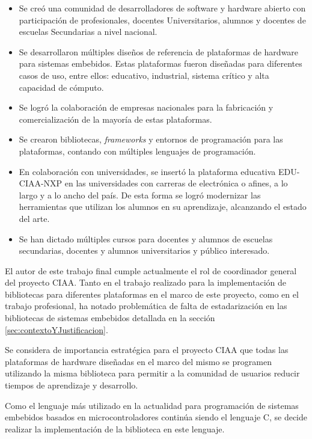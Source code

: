 \begin{itemize}
\item
Se creó una comunidad de desarrolladores de software y hardware abierto con participación de profesionales, docentes Universitarios, alumnos y docentes de escuelas Secundarias a nivel nacional.
\item
Se desarrollaron múltiples diseños de referencia de plataformas de hardware para sistemas embebidos. Estas plataformas fueron diseñadas para diferentes casos de uso, entre ellos: educativo, industrial, sistema crítico y alta capacidad de cómputo.
\item
Se logró la colaboración de empresas nacionales para la fabricación y comercialización de la mayoría de estas plataformas.
\item
Se crearon bibliotecas, \emph{frameworks} y entornos de programación para las plataformas, contando con múltiples lenguajes de programación.
\item
En colaboración con universidades, se insertó la plataforma educativa EDU-CIAA-NXP en las universidades con carreras de electrónica o afines, a lo largo y a lo ancho del país. De esta forma se logró modernizar las herramientas que utilizan los alumnos en su aprendizaje, alcanzando el estado del arte.
\item
Se han dictado múltiples cursos para docentes y alumnos de escuelas secundarias, docentes y alumnos universitarios y público interesado.
\end{itemize}

El autor de este trabajo final cumple actualmente el rol de coordinador general del proyecto CIAA. Tanto en el trabajo realizado para la implementación de bibliotecas para diferentes plataformas en el marco de este proyecto, como en el trabajo profesional, ha notado problemática de falta de estadarización en las bibliotecas de sistemas embebidos detallada en la sección \ref{sec:contextoYJustificacion}.

Se considera de importancia estratégica para el proyecto CIAA que todas las plataformas de hardware diseñadas en el marco del mismo se programen utilizando la misma biblioteca para permitir a la comunidad de usuarios reducir tiempos de aprendizaje y desarrollo.

Como el lenguaje más utilizado en la actualidad para programación de sistemas embebidos basados en microcontroladores continúa siendo el lenguaje C, se decide realizar la implementación de la biblioteca en este lenguaje.
